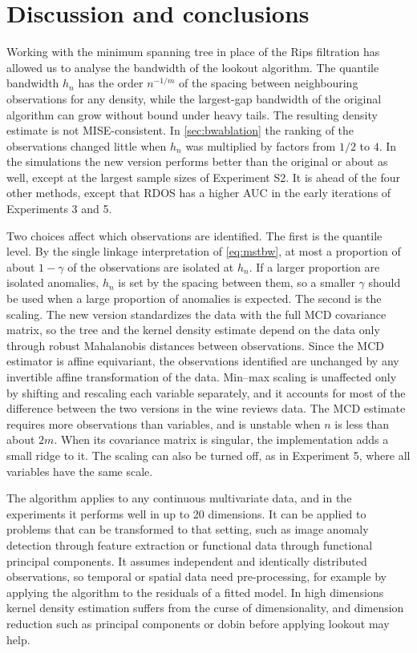 \section{Discussion and conclusions}\label{sec:conclusion}

Working with the minimum spanning tree in place of the Rips filtration has allowed us to analyse the bandwidth of the lookout algorithm. The quantile bandwidth $h_n$ has the order $n^{-1/m}$ of the spacing between neighbouring observations for any density, while the largest-gap bandwidth of the original algorithm can grow without bound under heavy tails. The resulting density estimate is not MISE-consistent. In \cref{sec:bwablation} the ranking of the observations changed little when $h_n$ was multiplied by factors from $1/2$ to $4$. In the simulations the new version performs better than the original or about as well, except at the largest sample sizes of Experiment S2. It is ahead of the four other methods, except that RDOS has a higher AUC in the early iterations of Experiments 3 and 5.

Two choices affect which observations are identified. The first is the quantile level. By the single linkage interpretation of \eqref{eq:mstbw}, at most a proportion of about $1-\gamma$ of the observations are isolated at $h_n$. If a larger proportion are isolated anomalies, $h_n$ is set by the spacing between them, so a smaller $\gamma$ should be used when a large proportion of anomalies is expected. The second is the scaling. The new version standardizes the data with the full MCD covariance matrix, so the tree and the kernel density estimate depend on the data only through robust Mahalanobis distances between observations. Since the MCD estimator is affine equivariant, the observations identified are unchanged by any invertible affine transformation of the data. Min--max scaling is unaffected only by shifting and rescaling each variable separately, and it accounts for most of the difference between the two versions in the wine reviews data. The MCD estimate requires more observations than variables, and is unstable when $n$ is less than about $2m$. When its covariance matrix is singular, the implementation adds a small ridge to it. The scaling can also be turned off, as in Experiment 5, where all variables have the same scale.

The algorithm applies to any continuous multivariate data, and in the experiments it performs well in up to 20 dimensions. It can be applied to problems that can be transformed to that setting, such as image anomaly detection through feature extraction or functional data through functional principal components. It assumes independent and identically distributed observations, so temporal or spatial data need pre-processing, for example by applying the algorithm to the residuals of a fitted model. In high dimensions kernel density estimation suffers from the curse of dimensionality, and dimension reduction such as principal components or dobin \citep{dobin} before applying lookout may help.

